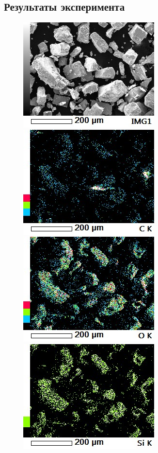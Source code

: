 \documentclass[14pt]{extarticle}
\begin{document}
\subsection*{Результаты эксперимента}

\begin{figure}[H]
	\includegraphics[width = 0.45\linewidth]{./pictures/map1_IMG1.jpg} \hspace{1em}%
	\includegraphics[width = 0.45\linewidth]{./pictures/map1_C_K.jpg} \hspace{1em}%
	\includegraphics[width = 0.45\linewidth]{./pictures/map1_O_K.jpg} \hspace{1em}%
	\includegraphics[width = 0.45\linewidth]{./pictures/map1_Si_K.jpg} \hspace{1em}%

\end{figure}
\end{document}
